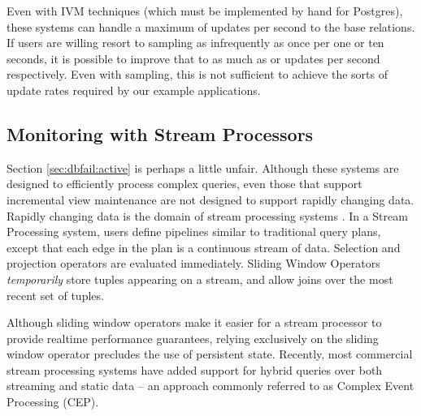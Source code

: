 Even with IVM techniques (which must be implemented by hand for Postgres), these systems can handle a maximum of  updates per second to the base relations.  If users are willing resort to sampling as infrequently as once per one or ten seconds, it is possible to improve that to as much as  or  updates per second respectively.  Even with sampling, this is not sufficient to achieve the sorts of update rates required by our example applications.

\subsection{Monitoring with Stream Processors}
Section \ref{sec:dbfail:active} is perhaps a little unfair.  Although these systems are designed to efficiently process complex queries, even those that support incremental view maintenance are not designed to support rapidly changing data.  Rapidly changing data is the domain of stream processing systems \cite{abadi2003aurora,arvind2003stream,chandrasekaran2003telegraphcq,abadi2005design}.  In a Stream Processing system, users define pipelines similar to traditional query plans, except that each edge in the plan is a continuous stream of data.  Selection and projection operators are evaluated immediately.  Sliding Window Operators\cite{datar2002maintaining} {\em temporarily} store tuples appearing on a stream, and allow joins over the most recent set of tuples.  

Although sliding window operators make it easier for a stream processor to provide realtime performance guarantees, relying exclusively on the sliding window operator precludes the use of persistent state.  Recently, most commercial stream processing systems have added support for hybrid queries over both streaming and static data -- an approach commonly referred to as Complex Event Processing (CEP)\cite{DBLP:conf/sigmod/WuDR06}.   

